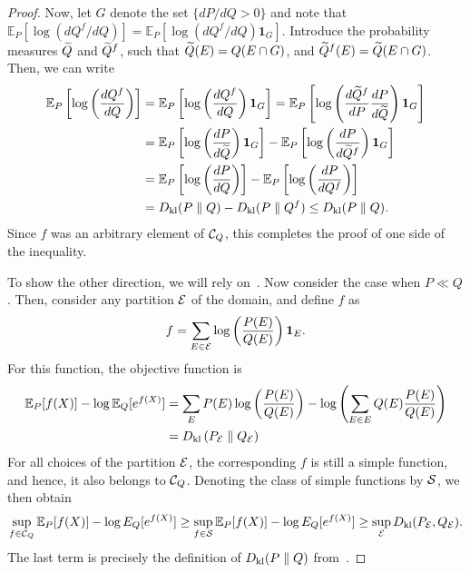 \begin{proof}
                
                Now, let $G$ denote the set $\{ dP/dQ > 0\}$ and note that $\mathbb{E}_P[\log(dQ^f/dQ)] = \mathbb{E}_P[\log(dQ^f/dQ) \boldsymbol{1}_G]$. Introduce the probability measures $\widetilde{Q}$ and $\widetilde{Q}^f$, such that $\widetilde{Q}(E) = Q(E \cap G)$, and $\widetilde{Q}^f(E) = \widetilde{Q}(E \cap G)$. Then, we can write 
                \begin{align}
                    \mathbb{E}_P \left[ \log \left( \frac{dQ^f}{dQ}\right)  \right] &= \mathbb{E}_P \left[ \log \left( \frac{dQ^f}{dQ}\right) \boldsymbol{1}_{G}  \right] =  \mathbb{E}_P \left[ \log \left( \frac{d\widetilde{Q}^f}{dP} \frac{dP}{d\widetilde{Q}} \right) \boldsymbol{1}_{G}  \right]  \\
                    & =   \mathbb{E}_P \left[ \log \left(  \frac{dP}{d\widetilde{Q}} \right) \boldsymbol{1}_{G}  \right]  - \mathbb{E}_P \left[ \log \left(  \frac{dP}{d\widetilde{Q}^f} \right) \boldsymbol{1}_{G}  \right]  \\
                     & =   \mathbb{E}_P \left[ \log \left(  \frac{dP}{dQ} \right)   \right]  - \mathbb{E}_P \left[ \log \left(  \frac{dP}{dQ^f} \right)   \right]  \\                   
                     & = D_{\text{kl}}(P \parallel Q) - D_{\text{kl}}(P \parallel Q^f) \leq D_{\text{kl}}(P \parallel Q). 
                \end{align}
                Since $f$ was an arbitrary element of $\mathcal{C}_Q$, this completes the proof of one side of the inequality. 

                To show the other direction, we will rely on~. 
                Now consider the case when $P \ll Q$. Then, consider any partition $\mathcal{E}$ of the domain, and define $f$ as 
                \begin{align}
                    f = \sum_{E \in \mathcal{E}} \log \left( \frac{P(E)}{Q(E)} \right) \boldsymbol{1}_E. 
                \end{align}
                For this function, the objective function is 
                \begin{align}
                    \mathbb{E}_P[f(X)] - \log \mathbb{E}_Q[e^{f(X)}] &= \sum_{E}P(E) \log \left( \frac{P(E)}{Q(E)} \right) - \log \left( \sum_{E\in E} Q(E) \frac{P(E)}{Q(E)} \right) \\
                    & = D_{\text{kl}} \left( P_{\mathcal{E}} \parallel Q_{\mathcal{E}} \right) 
                \end{align}
                For all choices of the partition $\mathcal{E}$, the corresponding $f$ is still a simple function, and hence, it also belongs to $\mathcal{C}_Q$. Denoting the class of simple functions by $\mathcal{S}$, we then obtain 
                \begin{align}
                    \sup_{f \in \mathcal{C}_Q} \mathbb{E}_P[f(X)] - \log E_Q[e^{f(X)}] \geq 
                    \sup_{f \in \mathcal{S}} \mathbb{E}_P[f(X)] - \log E_Q[e^{f(X)}]  \geq \sup_{\mathcal{E}} D_{\text{kl}}(P_{\mathcal{E}}, Q_{\mathcal{E}}). 
                \end{align}
                The last term is precisely the definition of $D_{\text{kl}}(P\parallel Q)$ from~. 
            \end{proof}

